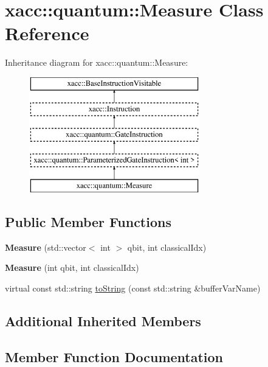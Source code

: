 \hypertarget{a01312}{}\section{xacc\+:\+:quantum\+:\+:Measure Class Reference}
\label{a01312}
Inheritance diagram for xacc\+:\+:quantum\+:\+:Measure\+:\begin{figure}[H]
\begin{center}
\leavevmode
\includegraphics[height=5.000000cm]{a01312}
\end{center}
\end{figure}
\subsection*{Public Member Functions}
\begin{DoxyCompactItemize}
\item 
\mbox{\label{a01312_a682adfd6e2d7ed266689b391b2ab68ab}} 
{\bfseries Measure} (std\+::vector$<$ int $>$ qbit, int classical\+Idx)
\item 
\mbox{\label{a01312_a9b8d9edca8ad2c3fb132780200f17335}} 
{\bfseries Measure} (int qbit, int classical\+Idx)
\item 
virtual const std\+::string \hyperlink{a01312_a1c51a5d68294dcb2ba1a9fbea63a730f}{to\+String} (const std\+::string \&buffer\+Var\+Name)
\end{DoxyCompactItemize}
\subsection*{Additional Inherited Members}


\subsection{Member Function Documentation}
\mbox{\label{a01312_a1c51a5d68294dcb2ba1a9fbea63a730f}} 

